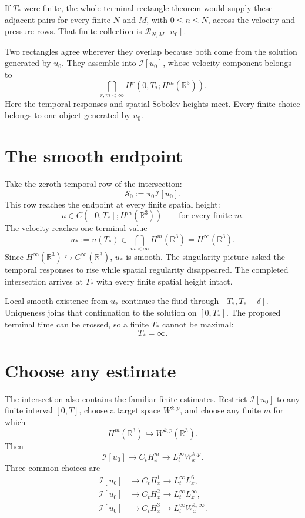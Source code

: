 \documentclass[12pt]{article}
\newcommand{\R}{\mathbb R}
\newcommand{\I}{\mathcal I}
\begin{document}
If \(T_*\) were finite, the whole-terminal rectangle theorem would supply these
adjacent pairs for every finite \(N\) and \(M\), with \(0\leq n\leq N\),
across the velocity and pressure rows. That finite collection is
\(\mathcal R_{N,M}[u_0]\).

Two rectangles agree wherever they overlap because both come from the solution
generated by \(u_0\). They assemble into \(\I[u_0]\), whose velocity component
belongs to
\[
  \bigcap_{r,m<\infty}
  H^r(0,T_*;H^m(\R^3)).
\]
Here the temporal responses and spatial Sobolev heights meet. Every finite
choice belongs to one object generated by \(u_0\).

\section*{The smooth endpoint}

Take the zeroth temporal row of the intersection:
\[
  \mathscr S_0:=\pi_0\I[u_0].
\]
This row reaches the endpoint at every finite spatial height:
\[
  u\in C([0,T_*];H^m(\R^3))
  \qquad
  \text{for every finite }m.
\]
The velocity reaches one terminal value
\[
  u_*:=u(T_*)
  \in
  \bigcap_{m<\infty}H^m(\R^3)
  =
  H^\infty(\R^3).
\]
Since \(H^\infty(\R^3)\hookrightarrow C^\infty(\R^3)\), \(u_*\) is smooth.
The singularity picture asked the temporal responses to rise while spatial
regularity disappeared. The completed intersection arrives at \(T_*\) with
every finite spatial height intact.

Local smooth existence from \(u_*\) continues the fluid through
\([T_*,T_*+\delta]\). Uniqueness joins that continuation to the solution on
\([0,T_*]\). The proposed terminal time can be crossed, so a finite \(T_*\)
cannot be maximal:
\[
  T_*=\infty.
\]

\section*{Choose any estimate}

The intersection also contains the familiar finite estimates. Restrict
\(\I[u_0]\) to any finite interval
\([0,T]\), choose a target space \(W^{k,p}\), and choose any finite \(m\) for
which
\[
  H^m(\R^3)\hookrightarrow W^{k,p}(\R^3).
\]
Then
\[
  \I[u_0]
  \longrightarrow
  C_tH_x^m
  \longrightarrow
  L_t^\infty W_x^{k,p}.
\]
Three common choices are
\[
\begin{aligned}
  \I[u_0]
  &\longrightarrow C_tH_x^1
  \longrightarrow L_t^\infty L_x^6,
  \\
  \I[u_0]
  &\longrightarrow C_tH_x^2
  \longrightarrow L_t^\infty L_x^\infty,
  \\
  \I[u_0]
  &\longrightarrow C_tH_x^3
  \longrightarrow L_t^\infty W_x^{1,\infty}.
\end{aligned}
\]
\end{document}
